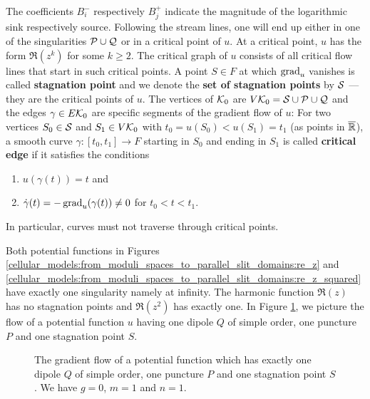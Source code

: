 The coefficients $B_i^-$ respectively $B_j^+$ indicate the magnitude of the logarithmic sink respectively source.
Following the stream lines, one will end up either in one of the singularities $\mathcal{P} \cup \mathcal{Q}$ or in a critical point of $u$.
At a critical point, $u$ has the form $\Re(z^k)$ for some $k \ge 2$.
The critical graph of $u$ consists of all critical flow lines that start in such critical points. %
\label{page:stagnation_point_parallel}%
A point $S \in F$ at which $\operatorname{grad}_u$ vanishes is called {\bf stagnation point} and we denote the {\bf set of stagnation points} by $\mathcal{S}$ --- they are the critical points of $u$.
\label{page:critical_graph_parallel}%
The vertices of $\mathcal{K}_0$ are $V\mathcal{K}_0 = \mathcal{S} \cup \mathcal{P} \cup \mathcal{Q}$ and the edges $\gamma \in E\mathcal{K}_0$ are specific segments of the gradient flow of $u$:
For two vertices $S_0 \in \mathcal{S}$ and $S_1 \in V\mathcal{K}_0$ with $t_0 = u(S_0) < u(S_1) = t_1$ (as points in $\overline {\mathbb R}$),
a smooth curve $\gamma \colon [t_0, t_1] \to F$ starting in $S_0$ and ending in $S_1$ is called {\bf critical edge} if it satisfies the conditions
\begin{enumerate}
    \item $u(\gamma(t)) = t$ and
    \item $\dot{\gamma}(t) = -\operatorname{grad}_u(\gamma(t)) \neq 0$ for $t_0 < t < t_1$.
\end{enumerate}
In particular, curves must not traverse through critical points.

Both potential functions in Figures \ref{cellular_models:from_moduli_spaces_to_parallel_slit_domains:re_z} and
\ref{cellular_models:from_moduli_spaces_to_parallel_slit_domains:re_z_squared} have exactly one singularity namely at infinity. 
The harmonic function $\Re(z)$ has no stagnation points and $\Re(z^2)$ has exactly one.
In Figure \ref{cellular_models:from_moduli_spaces_to_parallel_slit_domains:flow_with_one_puncture}, we picture the flow of a potential function $u$
having one dipole $Q$ of simple order, one puncture $P$ and one stagnation point $S$.
\begin{figure}[ht]
    \centering
    \def\svgwidth{.9\columnwidth}
    
    \caption{\label{cellular_models:from_moduli_spaces_to_parallel_slit_domains:flow_with_one_puncture}The gradient flow of a potential function which has exactly one dipole $Q$ of simple order, one puncture $P$ and one stagnation point $S$.
        We have $g=0$, $m=1$ and $n=1$.}
\end{figure}

